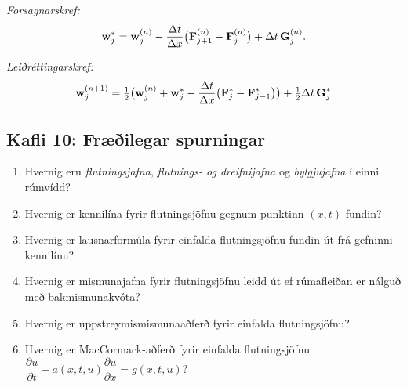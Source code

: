 \documentclass[icelandic,a4paper,12pt]{article}
\begin{document}
\smallskip
{\it Forsagnarskref:} 
$$
\mbox{${\bf w}$}_j^*=\mbox{${\bf w}$}_j^{(n)}-\dfrac{\Delta t}{\Delta x}\big( 
\mbox{${\bf F}$}_{j+1}^{(n)}-\mbox{${\bf F}$}_j^{(n)}\big)+\Delta t\, \mbox{${\bf G}$}_j^{(n)}.
$$

\smallskip
{\it Leiðréttingarskref:}
$$
\mbox{${\bf w}$}_j^{(n+1)}=\tfrac 12\big(\mbox{${\bf w}$}_j^{(n)} +\mbox{${\bf w}$}_j^*-\dfrac{\Delta t}{\Delta x}
\big(\mbox{${\bf F}$}_j^*-\mbox{${\bf F}$}_{j-1}^*\big) \big)+\tfrac 12 \Delta t\, \mbox{${\bf G}$}_j^*
$$



\subsection{Kafli 10: Fræðilegar spurningar}
\begin{enumerate}
  \item Hvernig eru {\it flutningsjafna}, {\it flutnings- og
      dreifnijafna} og {\it bylgjujafna} í einni rúmvídd?
  \item Hvernig er kennilína fyrir flutningsjöfnu gegnum punktinn
    $(x,t)$ fundin? 
  \item Hvernig er lausnarformúla fyrir einfalda flutningsjöfnu fundin
    út frá gefninni kennilínu?
  \item Hvernig er mismunajafna fyrir flutningsjöfnu leidd út  ef
    rúmafleiðan er nálguð með bakmismunakvóta?
  \item Hvernig er uppstreymismismunaaðferð fyrir einfalda
    flutningsjöfnu? 
  \item Hvernig er MacCormack-aðferð fyrir einfalda flutningsjöfnu
$\dfrac{\partial u}{\partial t}+a(x,t,u)\dfrac{\partial u}{\partial x}=g(x,t,u)$?
\end{enumerate}
\end{document}
